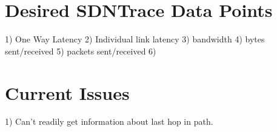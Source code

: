 \documentclass{article}
\begin{document}
\section{Desired SDNTrace Data Points}
	1) One Way Latency
	2) Individual link latency
	3) bandwidth
	4) bytes sent/received
	5) packets sent/received
	6) 

\section{Current Issues}
	1) Can't readily get information about last hop in path.
\end{document}
